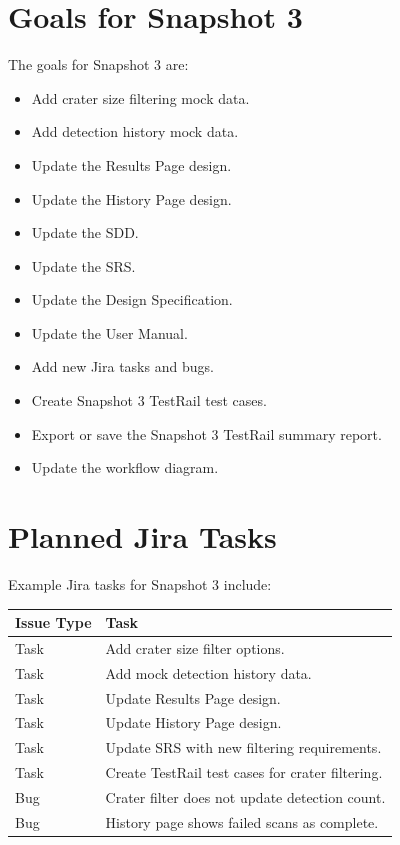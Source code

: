 \documentclass[12pt]{article}
\begin{document}
\section{Goals for Snapshot 3}

The goals for Snapshot 3 are:

\begin{itemize}
    \item Add crater size filtering mock data.
    \item Add detection history mock data.
    \item Update the Results Page design.
    \item Update the History Page design.
    \item Update the SDD.
    \item Update the SRS.
    \item Update the Design Specification.
    \item Update the User Manual.
    \item Add new Jira tasks and bugs.
    \item Create Snapshot 3 TestRail test cases.
    \item Export or save the Snapshot 3 TestRail summary report.
    \item Update the workflow diagram.
\end{itemize}

\section{Planned Jira Tasks}

Example Jira tasks for Snapshot 3 include:

\begin{longtable}{|p{1.5in}|p{4.5in}|}
\hline
\textbf{Issue Type} & \textbf{Task} \\
\hline
Task & Add crater size filter options. \\
\hline
Task & Add mock detection history data. \\
\hline
Task & Update Results Page design. \\
\hline
Task & Update History Page design. \\
\hline
Task & Update SRS with new filtering requirements. \\
\hline
Task & Create TestRail test cases for crater filtering. \\
\hline
Bug & Crater filter does not update detection count. \\
\hline
Bug & History page shows failed scans as complete. \\
\hline
\end{longtable}
\end{document}
